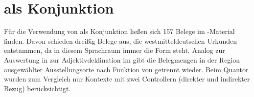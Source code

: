 
\section{ als Konjunktion}
\label{sec:caokonjunktion}

Für die Verwendung von  als Konjunktion ließen sich 157 Belege im
\CAO{}-Material finden. Davon schieden dreißig Belege aus, die
westmitteldeutschen Urkunden entstammen, da in diesem Sprachraum immer die Form
 steht. Analog zur Auswertung in  zur
Adjektivdeklination im \CAO{} gibt  die
Belegmengen in der Region ausgewählter Ausstellungs\-orte nach Funktion von
 getrennt wieder. Beim Quantor wurden zum Vergleich nur Kontexte
mit zwei Controllern (direkter und indirekter Bezug) berücksichtigt.


